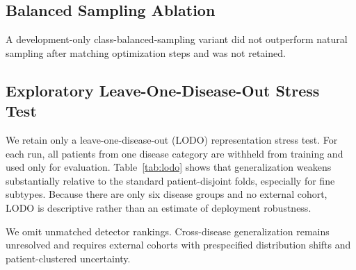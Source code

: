 \documentclass{article} %
\begin{document}
\subsection{Balanced Sampling Ablation}
\label{sec:appendix:sampler}

A development-only class-balanced-sampling variant did not outperform natural sampling after matching optimization steps and was not retained.

\subsection{Exploratory Leave-One-Disease-Out Stress Test}
\label{sec:appendix:novelty}

We retain only a leave-one-disease-out (LODO) representation stress test. For each run, all patients from one disease category are withheld from training and used only for evaluation. Table~\ref{tab:lodo} shows that generalization weakens substantially relative to the standard patient-disjoint folds, especially for fine subtypes. Because there are only six disease groups and no external cohort, LODO is descriptive rather than an estimate of deployment robustness.



We omit unmatched detector rankings. Cross-disease generalization remains unresolved and requires external cohorts with prespecified distribution shifts and patient-clustered uncertainty.
\end{document}
